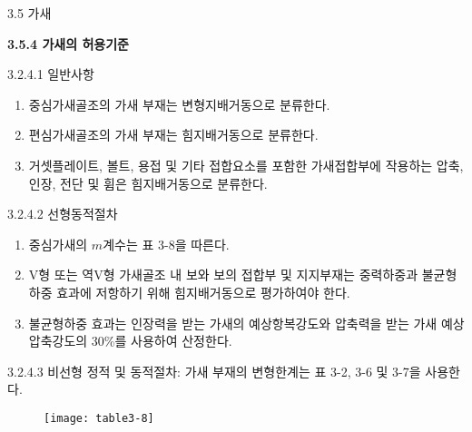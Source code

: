 	\begin{frame}{3.5 가새}

	\textbf{3.5.4 가새의 허용기준}
	
	3.2.4.1 일반사항
	
	\begin{enumerate}
		\item[(1)] 중심가새골조의 가새 부재는 변형지배거동으로 분류한다. 
		\item[(2)] 편심가새골조의 가새 부재는 힘지배거동으로 분류한다. 
		\item[(3)] 거셋플레이트, 볼트, 용접 및 기타 접합요소를 포함한 가새접합부에 작용하는 압축, 인장, 전단 및 휨은 힘지배거동으로 분류한다. 	
	\end{enumerate}		
	
	3.2.4.2	선형동적절차
	
	\begin{enumerate}
		\item[(1)] 중심가새의 $m$계수는 표 3-8을 따른다. 
		\item[(2)] V형 또는 역V형 가새골조 내 보와 보의 접합부 및 지지부재는 중력하중과 불균형하중 효과에 저항하기 위해 힘지배거동으로 평가하여야 한다. 
		\item[(3)] 불균형하중 효과는 인장력을 받는 가새의 예상항복강도와 압축력을 받는 가새 예상압축강도의 30\%를 사용하여 산정한다. 
	\end{enumerate}
	
	3.2.4.3 비선형 정적 및 동적절차: 가새 부재의 변형한계는 표 3-2, 3-6 및 3-7을 사용한다.  
	\end{frame}	


	\begin{frame}
		\begin{figure}
			\centering
			\texttt{[image: table3-8]}
		\end{figure}
	\end{frame}
		